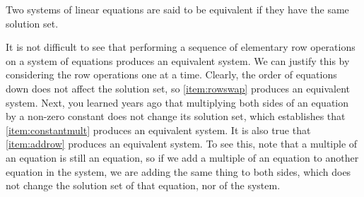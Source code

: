 \documentclass{ximera}
\begin{document}
\begin{definition}\label{def:equivsystems} Two systems of linear equations are said to be equivalent if they have the same solution set.
\end{definition}

It is not difficult to see that performing a sequence of elementary row operations on a system of equations produces an equivalent system.  We can justify this by considering the row operations one at a time.  Clearly, the order of equations down does not affect the solution set, so \ref{item:rowswap} produces an equivalent system.  Next, you learned years ago that multiplying both sides of an equation by a non-zero constant does not change its solution set, which establishes that \ref{item:constantmult} produces an equivalent system.  It is also true that \ref{item:addrow} produces an equivalent system.  To see this, note that a multiple of an equation is still an equation, so if we add a multiple of an equation to another equation in the system, we are adding the same thing to both sides, which does not change the solution set of that equation, nor of the system.


    
    
\end{document}
